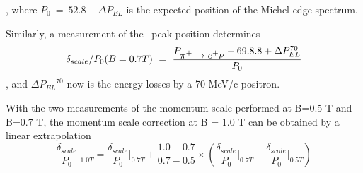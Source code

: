 , where $P_0 ~=~ 52.8 - \Delta{P_{EL}}$ is the expected  position of the Michel edge spectrum.

Similarly, a measurement of the \piplusenu\ peak position determines
$$
 \delta_{scale}/P_0 (B = 0.7 T) ~=~ \frac {P_{\mbox{$\pi^+ \to e^+ \nu$}}- 69.8.8 + \Delta{P_{EL}^{70}}}{P_0}
$$
, and $\Delta{P_{EL}}^{70}$ now is the energy losses by a 70 MeV/c positron.


With the two measurements of the momentum scale performed at B=0.5 T and B=0.7 T,
the momentum scale correction at B = 1.0 T can be obtained by a linear extrapolation
$$
{\frac{\delta_{scale}}{P_0}}\bigg\rvert_{1.0 T} =  {\frac{\delta_{scale}}{P_0}}\bigg\rvert_{0.7 T} + {\frac{1.0 - 0.7}{0.7-0.5}}
  \times
( {\frac{\delta_{scale}}{P_0}}\bigg\rvert_{0.7 T} -  {\frac{\delta_{scale}}{P_0}}\bigg\rvert_{0.5 T})
$$

